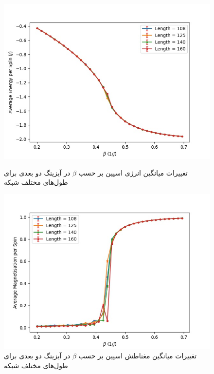 \documentclass[11pt, a4paper]{article}
\begin{document}
\begin{figure}[h!]
	\centering
  \begin{minipage}[b]{0.48\textwidth}
    \includegraphics[width=\textwidth]{ising_render_data_e[108, 125, 140, 160]_0.2_0.695_0.015_100.jpg}
    \caption{تغییرات میانگین انرژی اسپین‌ بر حسب $\beta$ در آیزینگ دو بعدی برای طول‌های مختلف شبکه}
    \label{fig:ising_e}
  \end{minipage}
  \hfill
  \begin{minipage}[b]{0.48\textwidth}
    \includegraphics[width=\textwidth]{ising_render_data_m[108, 125, 140, 160]_0.2_0.695_0.015_100.jpg}
    \caption{تغییرات میانگین مغناطش اسپین‌ بر حسب $\beta$ در آیزینگ دو بعدی برای طول‌های مختلف شبکه}
    \label{fig:ising_m}

\end{minipage}
\end{figure}
\end{document}
